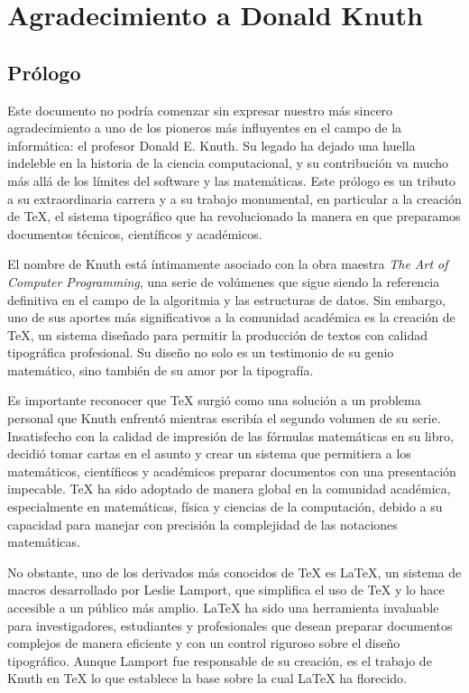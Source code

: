 
\chapter{Agradecimiento a Donald Knuth}

\section*{Prólogo}

Este documento no podría comenzar sin expresar nuestro más sincero agradecimiento a uno de los pioneros más influyentes en el campo de la informática: el profesor Donald E. Knuth. Su legado ha dejado una huella indeleble en la historia de la ciencia computacional, y su contribución va mucho más allá de los límites del software y las matemáticas. Este prólogo es un tributo a su extraordinaria carrera y a su trabajo monumental, en particular a la creación de \TeX{}, el sistema tipográfico que ha revolucionado la manera en que preparamos documentos técnicos, científicos y académicos.

El nombre de Knuth está íntimamente asociado con la obra maestra \textit{The Art of Computer Programming}, una serie de volúmenes que sigue siendo la referencia definitiva en el campo de la algoritmia y las estructuras de datos. Sin embargo, uno de sus aportes más significativos a la comunidad académica es la creación de \TeX{}, un sistema diseñado para permitir la producción de textos con calidad tipográfica profesional. Su diseño no solo es un testimonio de su genio matemático, sino también de su amor por la tipografía.

Es importante reconocer que \TeX{} surgió como una solución a un problema personal que Knuth enfrentó mientras escribía el segundo volumen de su serie. Insatisfecho con la calidad de impresión de las fórmulas matemáticas en su libro, decidió tomar cartas en el asunto y crear un sistema que permitiera a los matemáticos, científicos y académicos preparar documentos con una presentación impecable. \TeX{} ha sido adoptado de manera global en la comunidad académica, especialmente en matemáticas, física y ciencias de la computación, debido a su capacidad para manejar con precisión la complejidad de las notaciones matemáticas.

No obstante, uno de los derivados más conocidos de \TeX{} es \LaTeX{}, un sistema de macros desarrollado por Leslie Lamport, que simplifica el uso de \TeX{} y lo hace accesible a un público más amplio. \LaTeX{} ha sido una herramienta invaluable para investigadores, estudiantes y profesionales que desean preparar documentos complejos de manera eficiente y con un control riguroso sobre el diseño tipográfico. Aunque Lamport fue responsable de su creación, es el trabajo de Knuth en \TeX{} lo que establece la base sobre la cual \LaTeX{} ha florecido.

